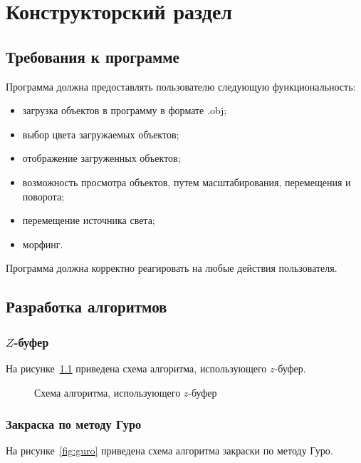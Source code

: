 \chapter{Конструкторский раздел}

\section{Требования к программе}

Программа должна предоставлять пользователю следующую функциональность:
\begin{itemize}[label*=---]
	\item загрузка объектов в программу в формате .obj;
	\item выбор цвета загружаемых объектов;
	\item отображение загруженных объектов;
	\item возможность просмотра объектов, путем масштабирования, перемещения и поворота;
	\item перемещение источника света;
	\item морфинг.
\end{itemize}

Программа должна корректно реагировать на любые действия пользователя.

\newpage

\section{Разработка алгоритмов}

\subsection{$Z$-буфер}

На рисунке~\ref{fig:zbuf} приведена схема алгоритма, использующего $z$-буфер.

\begin{figure}[h]
	\centering
	
	\caption{Схема алгоритма, использующего $z$-буфер}
	\label{fig:zbuf}
\end{figure}

\clearpage

\subsection{Закраска по методу Гуро}

На рисунке~\ref{fig:guro} приведена схема алгоритма закраски по методу Гуро.

